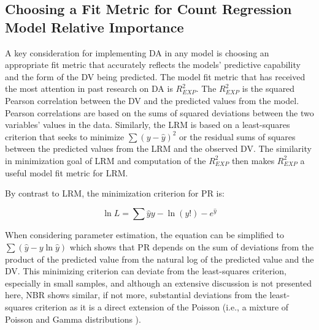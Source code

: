 \documentclass[ShortAfour,times,sageapa]{sagej}
\begin{document}
	\subsection{Choosing a Fit Metric for Count Regression Model Relative Importance}
	
	A key consideration for implementing DA in any model is choosing an appropriate fit metric that accurately reflects the models' predictive capability and the form of the DV being predicted.
	The model fit metric that has received the most attention in past research on DA is $R^2_{EXP}$.
	The $R^2_{EXP}$ is the squared Pearson correlation between the DV and the predicted values from the model. 
	Pearson correlations are based on the sums of squared deviations between the two variables' values in the data.  
	Similarly, the LRM is based on a least-squares criterion that seeks to minimize $\sum (y - \hat{y})^2$ or the residual sums of squares between the predicted values from the LRM and the observed DV.
	The similarity in minimization goal of LRM and computation of the $R^2_{EXP}$ then makes $R^2_{EXP}$ a useful model fit metric for LRM.
	
	By contrast to LRM, the minimization criterion for PR is:
	
		$$\ln L = \sum{\hat{y}y - \ln (y!) - e^{\hat{y}}}$$

	When considering parameter estimation, the equation can be simplified to $\sum (\hat{y} - y \ln \hat{y})$ \cite{cameron1996r} which shows that PR depends on the sum of deviations from the product of the predicted value from the natural log of the predicted value and the DV.
	This minimizing criterion can deviate from the least-squares criterion, especially in small samples, and 
	although an extensive discussion is not presented here, NBR shows similar, if not more, substantial deviations from the least-squares criterion as it is a direct extension of the Poisson (i.e., a mixture of Poisson and Gamma distributions \cite{blevins2015count}).
	
%	
	
\end{document}
